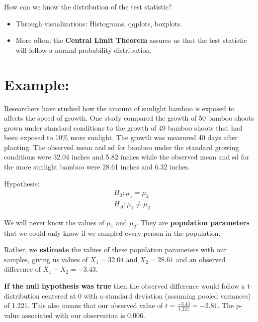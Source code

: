 \documentclass[12pt]{../notes}
\begin{document}
How can we know the distribution of the test statistic?
\begin{itemize}
\item Through visualizations: Histograms, qqplots, boxplots.
\item More often, the \textbf{Central Limit Theorem} assures us that the test statistic will follow a normal probability distribution.
\end{itemize}

\section{Example:}

Researchers have studied how the amount of sunlight bamboo is exposed to
affects the speed of growth. One study compared the growth of 50 bamboo shoots grown
under standard conditions to the growth of 49 bamboo shoots that had been exposed to 10\%
more sunlight. The growth was measured 40 days after planting. The observed mean and sd
for bamboo under the standard growing conditions were 32.04 inches and 5.82 inches while
the observed mean and sd for the more sunlight bamboo were 28.61 inches and 6.32 inches.

Hypothesis:
\begin{align*}
&H_0: \mu_1 = \mu_2 \\
&H_A:  \mu_1 \ne \mu_2 
\end{align*}

We will never know the values of $\mu_1$ and $\mu_2$. They are \textbf{population parameters} that we could only know if we sampled every person in the population.

\nspace
 Rather, we \textbf{estimate} the values of these population parameters with our samples, giving us values of $\bar{X}_1 = 32.04$ and $\bar{X}_2 = 28.61$ and an observed difference of $\bar{X}_1 - \bar{X}_2 = -3.43$. 
 
\nspace
\textbf{If the null hypothesis was true} then the observed difference would follow a t-distribution centered at 0 with a standard deviation (assuming pooled variances) of 1.221. This also means that our observed value of $t = \frac{-3.43}{1.221} = -2.81$. The p-value associated with our observation is 0.006. 

\begin{minipage}[l][3cm][c]{\textwidth}
\end{minipage}
\end{document}
